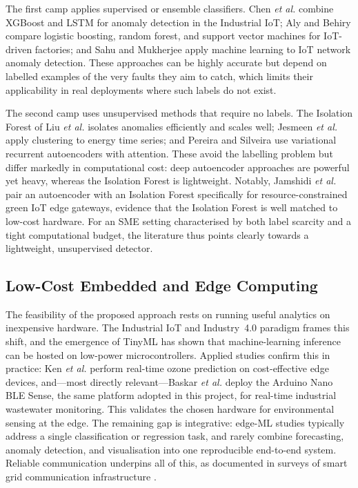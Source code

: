\documentclass[conference]{IEEEtran}
\begin{document}
The first camp applies supervised or ensemble classifiers. Chen \textit{et al.}
\cite{chen2024effective} combine XGBoost and LSTM for anomaly detection in the
Industrial IoT; Aly and Behiry \cite{aly2025enhancing} compare logistic
boosting, random forest, and support vector machines for IoT-driven factories;
and Sahu and Mukherjee \cite{sahu2020machine} apply machine learning to IoT
network anomaly detection. These approaches can be highly accurate but depend on
labelled examples of the very faults they aim to catch, which limits their
applicability in real deployments where such labels do not exist.
 
The second camp uses unsupervised methods that require no labels. The Isolation
Forest of Liu \textit{et al.} \cite{liu2008isolation} isolates anomalies
efficiently and scales well; Jesmeen \textit{et al.} \cite{jesmeen2021unsupervised}
apply clustering to energy time series; and Pereira and Silveira
\cite{pereira2018unsupervised} use variational recurrent autoencoders with
attention. These avoid the labelling problem but differ markedly in
computational cost: deep autoencoder approaches are powerful yet heavy, whereas
the Isolation Forest is lightweight. Notably, Jamshidi \textit{et al.}
\cite{jamshidi2025lightweight} pair an autoencoder with an Isolation Forest
specifically for resource-constrained green IoT edge gateways, evidence that the
Isolation Forest is well matched to low-cost hardware. For an SME setting
characterised by both label scarcity and a tight computational budget, the
literature thus points clearly towards a lightweight, unsupervised detector.
 
\subsection{Low-Cost Embedded and Edge Computing}
The feasibility of the proposed approach rests on running useful analytics on
inexpensive hardware. The Industrial IoT and Industry~4.0 paradigm
\cite{munirathinam2020industry} frames this shift, and the emergence of TinyML
\cite{warden2019tinyml} has shown that machine-learning inference can be hosted
on low-power microcontrollers. Applied studies confirm this in practice: Ken
\textit{et al.} \cite{ken2024advancing} perform real-time ozone prediction on
cost-effective edge devices, and---most directly relevant---Baskar \textit{et al.}
\cite{baskar2024edge} deploy the Arduino Nano BLE Sense, the same platform
adopted in this project, for real-time industrial wastewater monitoring. This
validates the chosen hardware for environmental sensing at the edge. The
remaining gap is integrative: edge-ML studies typically address a single
classification or regression task, and rarely combine forecasting, anomaly
detection, and visualisation into one reproducible end-to-end system. Reliable
communication underpins all of this, as documented in surveys of smart grid
communication infrastructure \cite{fan2012smart,yan2012survey}.
 
\end{document}

